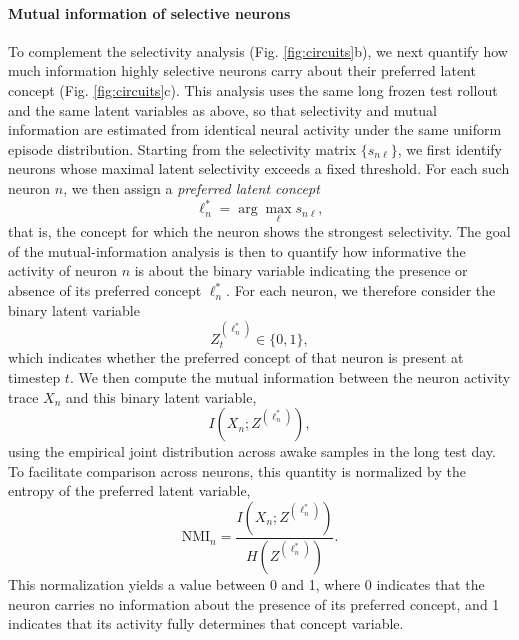 \documentclass{article}
\begin{document}
\paragraph*{Mutual information of selective neurons}
To complement the selectivity analysis (Fig. \ref{fig:circuits}b), we next quantify how much information highly selective neurons carry about their preferred latent concept (Fig. \ref{fig:circuits}c). This analysis uses the same long frozen test rollout and the same latent variables as above, so that selectivity and mutual information are estimated from identical neural activity under the same uniform episode distribution.
\newline\newline
Starting from the selectivity matrix $\{s_{n\ell}\}$, we first identify neurons whose maximal latent selectivity exceeds a fixed threshold. For each such neuron $n$, we then assign a \textit{preferred latent concept}
\[
\ell_n^\ast = \arg\max_{\ell} s_{n\ell},
\]
that is, the concept for which the neuron shows the strongest selectivity. The goal of the mutual-information analysis is then to quantify how informative the activity of neuron $n$ is about the binary variable indicating the presence or absence of its preferred concept $\ell_n^\ast$.
\newline\newline
For each neuron, we therefore consider the binary latent variable
\[
Z^{(\ell_n^\ast)}_t \in \{0,1\},
\]
which indicates whether the preferred concept of that neuron is present at timestep $t$. We then compute the mutual information between the neuron activity trace $X_n$ and this binary latent variable,
\[
I(X_n; Z^{(\ell_n^\ast)}),
\]
using the empirical joint distribution across awake samples in the long test day. To facilitate comparison across neurons, this quantity is normalized by the entropy of the preferred latent variable,
\[
\mathrm{NMI}_n
=
\frac{I(X_n; Z^{(\ell_n^\ast)})}{H(Z^{(\ell_n^\ast)})}.
\]
This normalization yields a value between 0 and 1, where 0 indicates that the neuron carries no information about the presence of its preferred concept, and 1 indicates that its activity fully determines that concept variable.
\end{document}

